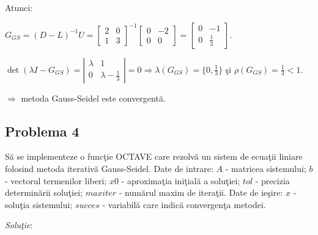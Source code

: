 \documentclass{exam}
\newcommand{\octavescript}[2]{
	
}
\begin{document}
Atunci:

${G}_{GS} = {(D-L)}^{-1}U =
	\left[ {\begin{array}{cc}
					2 & 0 \\
					1 & 3
				\end{array} } \right] ^ {-1}
	\left[ {\begin{array}{cc}
					0 & -2 \\
					0 & 0
				\end{array} } \right]
	=
	\left[ {\begin{array}{cc}
					0 & -1          \\
					0 & \frac{1}{3}
				\end{array} } \right]$.

$\det{(\lambda I - G_{GS})} = \left| {\begin{array}{cc}
		\lambda & 1                     \\
		0       & \lambda - \frac{1}{3}
	\end{array} } \right| = 0\Rightarrow \lambda(G_{GS}) = \{0,\frac{1}{3}\}$  \c{s}i $\rho(G_{GS}) = \frac{1}{3} < 1$.

$\Rightarrow$ metoda Gauss-Seidel este convergent\u{a}.


\subsection{Problema 4}
S\u{a} se implementeze o func\c{t}ie OCTAVE care rezolv\u{a} un sistem de ecua\c{t}ii liniare folosind metoda iterativ\u{a} Gauss-Seidel. Date de intrare: $A$ - matricea sistemului; $b$ - vectorul termenilor liberi; $x0$ - aproxima\c{t}ia ini\c{t}ial\u{a} a solu\c{t}iei; $tol$ - precizia determin\u{a}rii solu\c{t}iei; $maxiter$ - num\u{a}rul maxim de itera\c{t}ii. Date de ie\c{s}ire: $x$ - solu\c{t}ia sistemului; $succes$ - variabilă care indică convergenţa metodei.

\textit{Solu\c{t}ie}:

\octavescript{./src/GaussSeidel.m}{}
\end{document}
